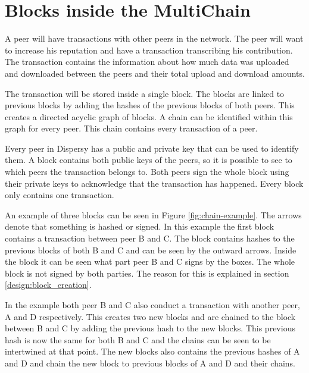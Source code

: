 \section{Blocks inside the MultiChain}
A peer will have transactions with other peers in the network.
The peer will want to increase his reputation and have a transaction transcribing his contribution.
The transaction contains the information about how much data was uploaded and downloaded between the peers
and their total upload and download amounts.

The transaction will be stored inside a single block.
The blocks are linked to previous blocks by adding the hashes of the previous blocks of both peers.
This creates a directed acyclic graph of blocks.
A chain can be identified within this graph for every peer.
This chain contains every transaction of a peer.

Every peer in Dispersy has a public and private key that can be used to identify them.
A block contains both public keys of the peers,
so it is possible to see to which peers the transaction belongs to.
Both peers sign the whole block using their private keys to acknowledge that the transaction has happened.
Every block only contains one transaction.

An example of three blocks can be seen in Figure \ref{fig:chain-example}.
The arrows denote that something is hashed or signed.
In this example the first block contains a transaction between peer B and C.
The block contains hashes to the previous blocks of both B and C
and can be seen by the outward arrows.
Inside the block it can be seen what part peer B and C signs by the boxes.
The whole block is not signed by both parties.
The reason for this is explained in section \ref{design:block_creation}.

In the example both peer B and C also conduct a transaction with another peer, A and D respectively.
This creates two new blocks and are chained to the block between B and C by adding the previous hash to the new blocks.
This previous hash is now the same for both B and C and the chains can be seen to be intertwined at that point.
The new blocks also contains the previous hashes of A and D
and chain the new block to previous blocks of A and D and their chains.

